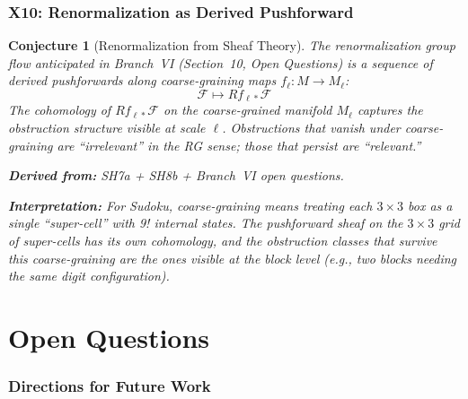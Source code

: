 \documentclass[11pt,letterpaper]{article}
\newtheorem{conjecture}{Conjecture}[section]
\newcommand{\sheaf}{\mathcal{F}}
\begin{document}
\section{X10: Renormalization as Derived Pushforward}

\begin{conjecture}[Renormalization from Sheaf 
Theory]\label{conj:x_rg}
The renormalization group flow anticipated in Branch~VI 
(Section~10, Open Questions) is a sequence of derived pushforwards 
along coarse-graining maps $f_\ell : M \to M_\ell$:
\begin{equation}\label{eq:rg_sheaf}
    \sheaf \mapsto Rf_{\ell *} \sheaf
\end{equation}
The cohomology of $Rf_{\ell *} \sheaf$ on the coarse-grained manifold 
$M_\ell$ captures the obstruction structure visible at scale $\ell$. 
Obstructions that vanish under coarse-graining are ``irrelevant'' in 
the RG sense; those that persist are ``relevant.''

\textbf{Derived from:} SH7a + SH8b + Branch~VI open questions.

\textbf{Interpretation:} For Sudoku, coarse-graining means treating 
each $3 \times 3$ box as a single ``super-cell'' with 9! internal 
states. The pushforward sheaf on the $3 \times 3$ grid of super-cells 
has its own cohomology, and the obstruction classes that survive this 
coarse-graining are the ones visible at the block level (e.g., 
two blocks needing the same digit configuration).
\end{conjecture}

\newpage
\part{Open Questions}

\section{Directions for Future Work}
\end{document}
